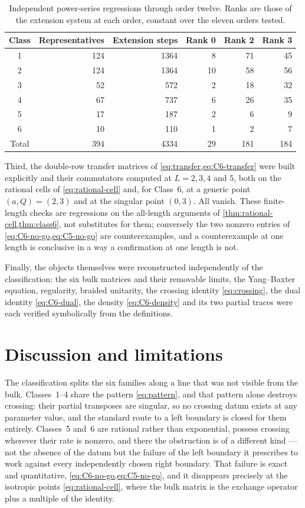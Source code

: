 \documentclass[11pt,reqno]{amsart}
\theoremstyle{plain}
\theoremstyle{definition}
\theoremstyle{remark}
\numberwithin{equation}{section}
\begin{document}
\begin{table}[t]
\centering
\caption{Independent power-series regressions through order twelve. Ranks are
those of the extension system at each order, constant over the eleven orders
tested.}
\label{tab:jets}
\begin{tabular}{c r r r r r}
\toprule
Class & Representatives & Extension steps & Rank 0 & Rank 2 & Rank 3 \\
\midrule
1 & 124 & 1364 & 8 & 71 & 45 \\
2 & 124 & 1364 & 10 & 58 & 56 \\
3 & 52 & 572 & 2 & 18 & 32 \\
4 & 67 & 737 & 6 & 26 & 35 \\
5 & 17 & 187 & 2 & 6 & 9 \\
6 & 10 & 110 & 1 & 2 & 7 \\
\midrule
Total & 394 & 4334 & 29 & 181 & 184 \\
\bottomrule
\end{tabular}
\end{table}

Third, the double-row transfer matrices of
\cref{eq:transfer,eq:C6-transfer} were built explicitly and their commutators
computed at $L=2,3,4$ and $5$, both on the rational cells of
\cref{eq:rational-cell} and, for Class~6, at a generic point $(a,Q)=(2,3)$ and at
the singular point $(0,3)$. All vanish. These finite-length checks are
regressions on the all-length arguments of
\cref{thm:rational-cell,thm:class6}, not substitutes for them; conversely the two
nonzero entries of \cref{eq:C6-no-go,eq:C5-no-go} are counterexamples, and a
counterexample at one length is conclusive in a way a confirmation at one length
is not.

Finally, the objects themselves were reconstructed independently of the
classification: the six bulk matrices and their removable limits, the Yang--Baxter
equation, regularity, braided unitarity, the crossing identity \cref{eq:crossing},
the dual identity \cref{eq:C6-dual}, the density \cref{eq:C6-density} and its two
partial traces were each verified symbolically from the definitions.

\section{Discussion and limitations}
\label{sec:discussion}

The classification splits the six families along a line that was not visible from
the bulk. Classes~1--4 share the pattern \cref{eq:pattern}, and that pattern
alone destroys crossing: their partial transposes are singular, so no crossing
datum exists at any parameter value, and the standard route to a left boundary is
closed for them entirely. Classes~5 and~6 are rational rather than exponential,
possess crossing wherever their rate is nonzero, and there the obstruction is of a
different kind --- not the absence of the datum but the failure of the left
boundary it prescribes to work against every independently chosen right boundary.
That failure is exact and quantitative, \cref{eq:C6-no-go,eq:C5-no-go}, and it
disappears precisely at the isotropic points \cref{eq:rational-cell}, where the
bulk matrix is the exchange operator plus a multiple of the identity.
\end{document}
